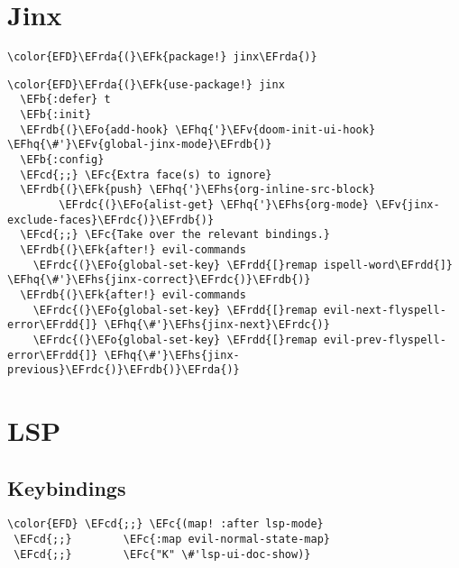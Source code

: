 \documentclass[12pt]{article}
\theoremstyle{plain}%
\theoremstyle{definition}
\theoremstyle{remark}
\newcommand{\EFc}[1]{\textcolor{EFc}{#1}} %
\newcommand{\EFcd}[1]{\textcolor{EFcd}{#1}} %
\newcommand{\EFk}[1]{\textcolor{EFk}{#1}} %
\newcommand{\EFb}[1]{\textcolor{EFb}{#1}} %
\newcommand{\EFv}[1]{\textcolor{EFv}{#1}} %
\newcommand{\EFo}[1]{\textcolor{EFo}{#1}} %
\newcommand{\EFhq}[1]{\textcolor{EFhq}{#1}} %
\newcommand{\EFhs}[1]{\textcolor{EFhs}{#1}} %
\newcommand{\EFrda}[1]{\textcolor{EFrda}{#1}} %
\newcommand{\EFrdb}[1]{\textcolor{EFrdb}{#1}} %
\newcommand{\EFrdc}[1]{\textcolor{EFrdc}{#1}} %
\newcommand{\EFrdd}[1]{\textcolor{EFrdd}{#1}} %
\begin{document}
\section{Jinx}
\label{sec:org95af151}
\begin{Code}
\begin{Verbatim}
\color{EFD}\EFrda{(}\EFk{package!} jinx\EFrda{)}
\end{Verbatim}
\end{Code}
\begin{Code}
\begin{Verbatim}
\color{EFD}\EFrda{(}\EFk{use-package!} jinx
  \EFb{:defer} t
  \EFb{:init}
  \EFrdb{(}\EFo{add-hook} \EFhq{'}\EFv{doom-init-ui-hook} \EFhq{\#'}\EFv{global-jinx-mode}\EFrdb{)}
  \EFb{:config}
  \EFcd{;;} \EFc{Extra face(s) to ignore}
  \EFrdb{(}\EFk{push} \EFhq{'}\EFhs{org-inline-src-block}
        \EFrdc{(}\EFo{alist-get} \EFhq{'}\EFhs{org-mode} \EFv{jinx-exclude-faces}\EFrdc{)}\EFrdb{)}
  \EFcd{;;} \EFc{Take over the relevant bindings.}
  \EFrdb{(}\EFk{after!} evil-commands
    \EFrdc{(}\EFo{global-set-key} \EFrdd{[}remap ispell-word\EFrdd{]} \EFhq{\#'}\EFhs{jinx-correct}\EFrdc{)}\EFrdb{)}
  \EFrdb{(}\EFk{after!} evil-commands
    \EFrdc{(}\EFo{global-set-key} \EFrdd{[}remap evil-next-flyspell-error\EFrdd{]} \EFhq{\#'}\EFhs{jinx-next}\EFrdc{)}
    \EFrdc{(}\EFo{global-set-key} \EFrdd{[}remap evil-prev-flyspell-error\EFrdd{]} \EFhq{\#'}\EFhs{jinx-previous}\EFrdc{)}\EFrdb{)}\EFrda{)}
\end{Verbatim}
\end{Code}
\section{LSP}
\label{sec:orge53cb79}
\subsection{Keybindings}
\label{sec:org3457b0e}
\begin{Code}
\begin{Verbatim}
\color{EFD} \EFcd{;;} \EFc{(map! :after lsp-mode}
 \EFcd{;;}        \EFc{:map evil-normal-state-map}
 \EFcd{;;}        \EFc{"K" \#'lsp-ui-doc-show)}
\end{Verbatim}
\end{Code}
\end{document}
